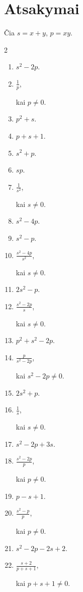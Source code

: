 \documentclass[11pt,a4paper]{article}
\begin{document}
\section*{Atsakymai}
Čia \(s=x+y\), \(p=xy\).
\begin{multicols}{2}
\begin{enumerate}[start=1]
\item \(\displaystyle s^2-2p\).
\item \(\displaystyle \frac1p\),\par\nopagebreak\smallskip kai \(p\ne0\).
\item \(\displaystyle p^2+s\).
\item \(\displaystyle p+s+1\).
\item \(\displaystyle s^2+p\).
\item \(\displaystyle sp\).
\item \(\displaystyle \frac1{s^2}\),\par\nopagebreak\smallskip kai \(s\ne0\).
\item \(\displaystyle s^2-4p\).
\item \(\displaystyle s^2-p\).
\item \(\displaystyle \frac{s^2-4p}{s^2}\),\par\nopagebreak\smallskip kai \(s\ne0\).
\item \(\displaystyle 2s^2-p\).
\item \(\displaystyle \frac{s^2-2p}{s}\),\par\nopagebreak\smallskip kai \(s\ne0\).
\item \(\displaystyle p^2+s^2-2p\).
\item \(\displaystyle \frac p{s^2-2p}\),\par\nopagebreak\smallskip kai \(s^2-2p\ne0\).
\item \(\displaystyle 2s^2+p\).
\item \(\displaystyle \frac1s\),\par\nopagebreak\smallskip kai \(s\ne0\).
\item \(\displaystyle s^2-2p+3s\).
\item \(\displaystyle \frac{s^2-2p}{p}\),\par\nopagebreak\smallskip kai \(p\ne0\).
\item \(\displaystyle p-s+1\).
\item \(\displaystyle \frac{s^2-p}{p}\),\par\nopagebreak\smallskip kai \(p\ne0\).
\item \(\displaystyle s^2-2p-2s+2\).
\item \(\displaystyle \frac{s+2}{p+s+1}\),\par\nopagebreak\smallskip kai \(p+s+1\ne0\).

\end{enumerate}
\end{multicols}
\end{document}
